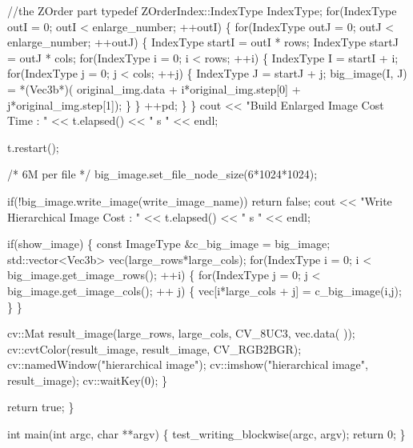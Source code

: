 \begin{DoxyCodeInclude}
        \textcolor{comment}{//the ZOrder part}
        \textcolor{keyword}{typedef} ZOrderIndex::IndexType IndexType;
        \textcolor{keywordflow}{for}(IndexType outI = 0; outI < enlarge\_number; ++outI) \{
                \textcolor{keywordflow}{for}(IndexType outJ = 0; outJ < enlarge\_number; ++outJ) \{
                        IndexType startI = outI * rows;
                        IndexType startJ = outJ * cols;
                        \textcolor{keywordflow}{for}(IndexType i = 0; i < rows; ++i) \{
                                IndexType I = startI + i;
                                \textcolor{keywordflow}{for}(IndexType j = 0; j < cols; ++j) \{
                                        IndexType J = startJ + j;
                                        big\_image(I, J) = *(Vec3b*)(
      original\_img.data + i*original\_img.step[0] + j*original\_img.step[1]);
                                \}
                        \}
                        ++pd;
                \}
        \}
        cout << \textcolor{stringliteral}{"Build Enlarged Image Cost Time : "} << t.elapsed() << \textcolor{stringliteral}{" s "} << 
      endl;

        t.restart();

        \textcolor{comment}{/* 6M per file */}
        big\_image.set\_file\_node\_size(6*1024*1024);

        \textcolor{keywordflow}{if}(!big\_image.write\_image(write\_image\_name)) \textcolor{keywordflow}{return} \textcolor{keyword}{false};
        cout << \textcolor{stringliteral}{"Write Hierarchical Image Cost : "} << t.elapsed() << \textcolor{stringliteral}{" s "} << 
      endl;

        \textcolor{keywordflow}{if}(show\_image) \{
                \textcolor{keyword}{const} ImageType &c\_big\_image = big\_image;
                std::vector<Vec3b> vec(large\_rows*large\_cols);
                \textcolor{keywordflow}{for}(IndexType i = 0; i < big\_image.get\_image\_rows(); ++i) \{
                        \textcolor{keywordflow}{for}(IndexType j = 0; j < big\_image.get\_image\_cols(); ++
      j) \{
                                vec[i*large\_cols  + j] = c\_big\_image(i,j);
                        \}
                \}

                cv::Mat result\_image(large\_rows, large\_cols, CV\_8UC3, vec.data(
      ));
                cv::cvtColor(result\_image, result\_image, CV\_RGB2BGR);
                cv::namedWindow(\textcolor{stringliteral}{"hierarchical image"});
                cv::imshow(\textcolor{stringliteral}{"hierarchical image"}, result\_image);
                cv::waitKey(0);
        \}

        \textcolor{keywordflow}{return} \textcolor{keyword}{true};
\}

\textcolor{keywordtype}{int} main(\textcolor{keywordtype}{int} argc, \textcolor{keywordtype}{char} **argv)
\{
        test\_writing\_blockwise(argc, argv);
        \textcolor{keywordflow}{return} 0;
\}

\end{DoxyCodeInclude}
 